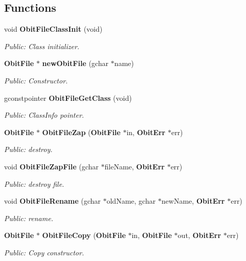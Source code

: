 \subsection*{Functions}
\begin{CompactItemize}
\item 
void {\bf Obit\-File\-Class\-Init} (void)
\begin{CompactList}\small\item\em Public: Class initializer. \item\end{CompactList}\item 
{\bf Obit\-File} $\ast$ {\bf new\-Obit\-File} (gchar $\ast$name)
\begin{CompactList}\small\item\em Public: Constructor. \item\end{CompactList}\item 
gconstpointer {\bf Obit\-File\-Get\-Class} (void)
\begin{CompactList}\small\item\em Public: Class\-Info pointer. \item\end{CompactList}\item 
{\bf Obit\-File} $\ast$ {\bf Obit\-File\-Zap} ({\bf Obit\-File} $\ast$in, {\bf Obit\-Err} $\ast$err)
\begin{CompactList}\small\item\em Public: destroy. \item\end{CompactList}\item 
void {\bf Obit\-File\-Zap\-File} (gchar $\ast$file\-Name, {\bf Obit\-Err} $\ast$err)
\begin{CompactList}\small\item\em Public: destroy file. \item\end{CompactList}\item 
void {\bf Obit\-File\-Rename} (gchar $\ast$old\-Name, gchar $\ast$new\-Name, {\bf Obit\-Err} $\ast$err)
\begin{CompactList}\small\item\em Public: rename. \item\end{CompactList}\item 
{\bf Obit\-File} $\ast$ {\bf Obit\-File\-Copy} ({\bf Obit\-File} $\ast$in, {\bf Obit\-File} $\ast$out, {\bf Obit\-Err} $\ast$err)
\begin{CompactList}\small\item\em Public: Copy constructor. \item\end{CompactList}\item 

\end{CompactItemize}
